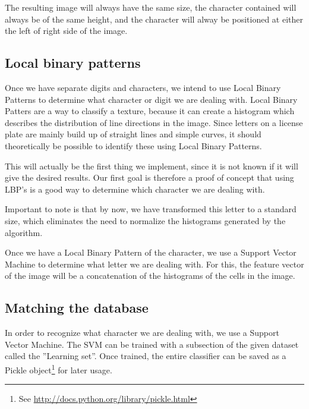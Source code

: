 \documentclass[a4paper]{article}
\begin{document}
The resulting image will always have the same size, the character contained
will always be of the same height, and the character will alway be positioned
at either the left of right side of the image.

\subsection{Local binary patterns}

Once we have separate digits and characters, we intend to use Local Binary
Patterns to determine what character or digit we are dealing with. Local Binary
Patters are a way to classify a texture, because it can create a histogram
which describes the distribution of line directions in the image. Since letters
on a license plate are mainly build up of straight lines and simple curves, it
should theoretically be possible to identify these using Local Binary Patterns.

This will actually be the first thing we implement, since it is not known if it
will give the desired results. Our first goal is therefore a proof of concept
that using LBP's is a good way to determine which character we are dealing
with.

Important to note is that by now, we have transformed this letter to a standard
size, which eliminates the need to normalize the histograms generated by the
algorithm.

Once we have a Local Binary Pattern of the character, we use a Support Vector
Machine to determine what letter we are dealing with. For this, the feature
vector of the image will be a concatenation of the histograms of the cells in
the image.

\subsection{Matching the database}

In order to recognize what character we are dealing with, we use a Support
Vector Machine. The SVM can be trained with a subsection of the given dataset
called the ''Learning set''. Once trained, the entire classifier can be saved
as a Pickle object\footnote{See
\url{http://docs.python.org/library/pickle.html}} for later usage.
\end{document}
